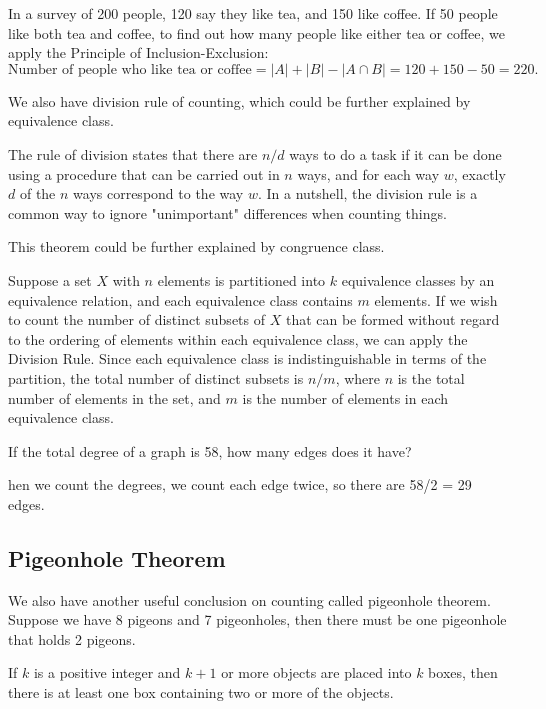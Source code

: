         \begin{example}
            In a survey of 200 people, 120 say they like tea, and 150 like coffee. If 50 people like both tea and coffee, to find out how many people like either tea or coffee, we apply the Principle of Inclusion-Exclusion:
            $$ \text{Number of people who like tea or coffee} = |A| + |B| - |A \cap B| = 120 + 150 - 50 = 220. $$
        \end{example}

        We also have division rule of counting, which could be further explained by equivalence class. 
        \begin{theorem}
            The rule of division states that there are $n/d$ ways to do a task if it can be done using a procedure that can be carried out in 
                $n$ ways, and for each way $w$, exactly $d$ of the $n$ ways correspond to the way $w$. In a nutshell, the division rule is a common way to ignore "unimportant" differences when counting things.
        \end{theorem}
            This theorem could be further explained by congruence class.
            \begin{example}
                Suppose a set \(X\) with \(n\) elements is partitioned into \(k\) equivalence classes by an equivalence relation, and each equivalence class contains \(m\) elements. If we wish to count the number of distinct subsets of \(X\) that can be formed without regard to the ordering of elements within each equivalence class, we can apply the Division Rule. Since each equivalence class is indistinguishable in terms of the partition, the total number of distinct subsets is \(n/m\), where \(n\) is the total number of elements in the set, and \(m\) is the number of elements in each equivalence class.
            \end{example}

            \begin{example}
                If the total degree of a graph is 58, how many edges does it have?
            \end{example}
            \begin{solution}
                hen we count the degrees, we count each edge twice, so there are 58/2 = 29 edges.
            \end{solution}
    \subsection{Pigeonhole Theorem}
        We also have another useful conclusion on counting called pigeonhole theorem. Suppose we have 8 pigeons and 7 pigeonholes, then there must be one pigeonhole that
        holds 2 pigeons.
        \begin{theorem}
            If $k$ is a positive integer and $k+1$ or more objects are placed into $k$ boxes, then there is at least one box containing two or more of the objects.
        \end{theorem}
        
